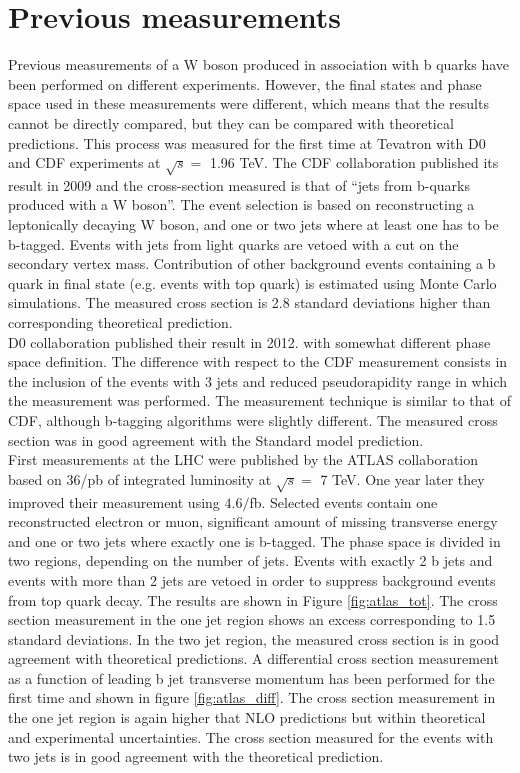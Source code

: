 \section{Previous measurements}

	\par Previous measurements of a W boson produced in association with b quarks have been performed on different experiments. However, the final states and phase space used in these measurements were different, which means that the results cannot be directly compared, but they can be compared with theoretical predictions. This process was measured for the first time at Tevatron with D0 and CDF experiments at $\sqrt{s} =$ 1.96 TeV. The CDF collaboration published its result in 2009 and the cross-section measured is that of “jets from b-quarks produced with a W boson”\citep{Aaltonen:2009qi}. The event selection is based on reconstructing a leptonically decaying W boson, and one or two jets where at least one has to be b-tagged. Events with jets from light quarks are vetoed with a cut on the secondary vertex mass. Contribution of other background events containing a b quark in final state (e.g. events with top quark) is estimated using Monte Carlo simulations. The measured cross section is 2.8 standard deviations higher than corresponding theoretical prediction. \\
	D0 collaboration published their result in 2012. with somewhat different phase space definition\citep{D0:2012qt}. The difference with respect to the CDF measurement consists in the inclusion of the events with 3 jets and reduced pseudorapidity range in which the measurement was performed. The measurement technique is similar to that of CDF, although b-tagging algorithms were slightly different. The measured cross section was in good agreement with the Standard model prediction.\\
	First measurements at the LHC were published by the ATLAS collaboration based on 36/pb of integrated luminosity at $\sqrt{s} =$ 7 TeV. One year later they improved their measurement using $4.6/$fb.\citep{Aad:2013vka} Selected events contain one reconstructed electron or muon, significant amount of missing transverse energy and one or two jets where exactly one is b-tagged. The phase space is divided in two regions, depending on the number of jets. Events with exactly 2 b jets and events with more than 2 jets are vetoed in order to suppress background events from top quark decay. The results are shown in Figure \ref{fig:atlas_tot}. The cross section measurement in the one jet region shows an excess corresponding to 1.5 standard deviations. In the two jet region, the measured cross section is in good agreement with theoretical predictions. A differential cross section measurement as a function of leading b jet transverse momentum has been performed for the first time and shown in figure \ref{fig:atlas_diff}. The cross section measurement in the one jet region is again higher that NLO predictions but within theoretical and experimental uncertainties. The cross section measured for the events with two jets is in good agreement with the theoretical prediction.
